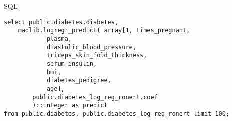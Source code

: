 \documentclass[english,presentation]{pivotalbeamer}
\begin{document}
\begin{frame}[fragile,label=sec-3-3]{SQL}
 \begin{verbatim}
select public.diabetes.diabetes,
    madlib.logregr_predict( array[1, times_pregnant,
            plasma,
            diastolic_blood_pressure,
            triceps_skin_fold_thickness,
            serum_insulin,
            bmi,
            diabetes_pedigree,
            age],
        public.diabetes_log_reg_ronert.coef
        )::integer as predict
from public.diabetes, public.diabetes_log_reg_ronert limit 100;
\end{verbatim}
\end{frame}
\end{document}
